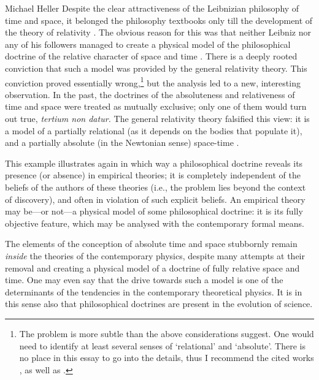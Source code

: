 \begin{artengenv}{Michael Heller}
Despite the clear attractiveness of the Leibnizian philosophy of time
and space, it belonged the philosophy textbooks only till the development of  the theory of relativity
\parencite[cf.][]{heller_physicists_1975}.
The obvious reason for this was that neither Leibniz
nor any of his followers managed to create a physical model of the philosophical doctrine of the relative character of
space and time
\parencite[cf.][]{raine_science_1981}.
There is a deeply rooted conviction that such a
model was provided by the general relativity theory. This conviction proved essentially wrong,\footnote{The problem is
more subtle than the above considerations suggest. One would need to identify at least several senses of `relational'
and `absolute'. There is no place in this essay to go into the details, thus I recommend the cited works
\parencite{raine_science_1981},
as well as
\parencite{friedman_foundations_1983}.
} but the
analysis led to a new, interesting observation. In the past, the doctrines of the absoluteness and relativeness of time
and space were treated as mutually exclusive; only one of them would turn out true, \textit{tertium non datur. }The
general relativity theory falsified this view: it is a model of a partially relational (as it depends on the bodies
that populate it), and a partially absolute (in the Newtonian sense) space-time
\parencite[cf.][chap.13]{raine_science_1981}.

This example illustrates again in which way a philosophical doctrine reveals its presence (or absence) in empirical
theories; it is completely independent of the beliefs of the authors of these theories (i.e., the problem lies beyond
the context of discovery), and often in violation of such explicit beliefs. An empirical theory may be---or not---a
physical model of some philosophical doctrine: it is its fully objective feature, which may be analysed with the
contemporary formal means.\label{heller-model-phil}

The elements of the conception of absolute time and space stubbornly remain \textit{inside} the theories of the
contemporary physics, despite many attempts at their removal and creating a physical model of a doctrine of fully
relative space and time. One may even say that the drive towards such a model is one of the determinants of the
tendencies in the contemporary theoretical physics. It is in this sense also that philosophical doctrines are present
in the evolution of science.



\end{artengenv}
